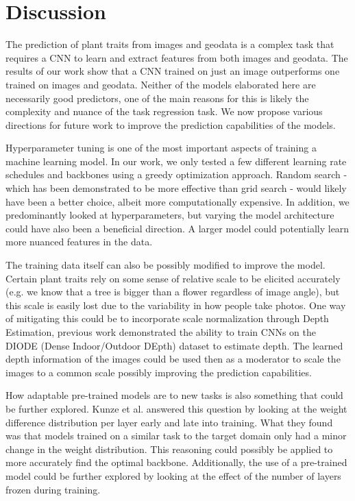 \documentclass[12pt,a4paper,oneside]{article}
\begin{document}
\section{Discussion}

The prediction of plant traits from images and geodata is a complex task that requires a CNN to learn and extract features from both images and geodata. The results of our work show that a CNN trained on just an image outperforms one trained on images and geodata. Neither of the models elaborated here are necessarily good predictors, one of the main reasons for this is likely the complexity and nuance of the task regression task. We now propose various directions for future work to improve the prediction capabilities of the models.

Hyperparameter tuning is one of the most important aspects of training a machine learning model. In our work, we only tested a few different learning rate schedules and backbones using a greedy optimization approach. Random search - which has been demonstrated to be more effective than grid search \cite{JMLR:v13:bergstra12a} - would likely have been a better choice, albeit more computationally expensive. In addition, we predominantly looked at hyperparameters, but varying the model architecture could have also been a beneficial direction. A larger model could potentially learn more nuanced features in the data. 

The training data itself can also be possibly modified to improve the model. Certain plant traits rely on some sense of relative scale to be elicited accurately (e.g. we know that a tree is bigger than a flower regardless of image angle), but this scale is easily lost due to the variability in how people take photos. One way of mitigating this could be to incorporate scale normalization through Depth Estimation, previous work \cite{Ummenhofer_2017} demonstrated the ability to train CNNs on the DIODE (Dense Indoor/Outdoor DEpth) \cite{vasiljevic2019diode} dataset to estimate depth. The learned depth information of the images could be used then as a moderator to scale the images to a common scale possibly improving the prediction capabilities.

How adaptable pre-trained models are to new tasks is also something that could be further explored. Kunze et al. \cite{kunze2017transfer} answered this question by looking at the weight difference distribution per layer early and late into training. What they found was that models trained on a similar task to the target domain only had a minor change in the weight distribution. This reasoning could possibly be applied to more accurately find the optimal backbone. Additionally, the use of a pre-trained model could be further explored by looking at the effect of the number of layers frozen during training. 
\end{document}

